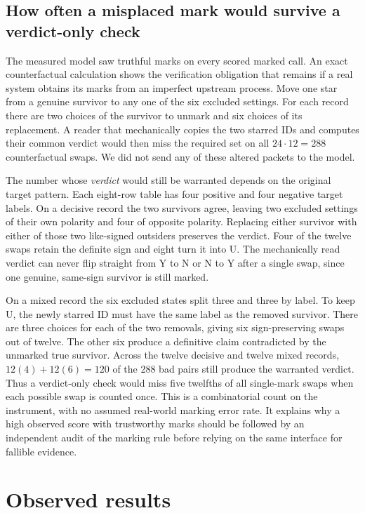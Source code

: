 \documentclass[12pt,letterpaper]{article}
\begin{document}
\subsection{How often a misplaced mark would survive a verdict-only check}

The measured model saw truthful marks on every scored marked call. An exact counterfactual calculation shows the verification obligation that remains if a real system obtains its marks from an imperfect upstream process. Move one star from a genuine survivor to any one of the six excluded settings. For each record there are two choices of the survivor to unmark and six choices of its replacement. A reader that mechanically copies the two starred IDs and computes their common verdict would then miss the required set on all $24\cdot 12=288$ counterfactual swaps. We did not send any of these altered packets to the model.

The number whose \emph{verdict} would still be warranted depends on the original target pattern. Each eight-row table has four positive and four negative target labels. On a decisive record the two survivors agree, leaving two excluded settings of their own polarity and four of opposite polarity. Replacing either survivor with either of those two like-signed outsiders preserves the verdict. Four of the twelve swaps retain the definite sign and eight turn it into U. The mechanically read verdict can never flip straight from Y to N or N to Y after a single swap, since one genuine, same-sign survivor is still marked.

On a mixed record the six excluded states split three and three by label. To keep U, the newly starred ID must have the same label as the removed survivor. There are three choices for each of the two removals, giving six sign-preserving swaps out of twelve. The other six produce a definitive claim contradicted by the unmarked true survivor. Across the twelve decisive and twelve mixed records, $12(4)+12(6)=120$ of the 288 bad pairs still produce the warranted verdict. Thus a verdict-only check would miss five twelfths of all single-mark swaps when each possible swap is counted once. This is a combinatorial count on the instrument, with no assumed real-world marking error rate. It explains why a high observed score with trustworthy marks should be followed by an independent audit of the marking rule before relying on the same interface for fallible evidence.


\section{Observed results}
\end{document}
